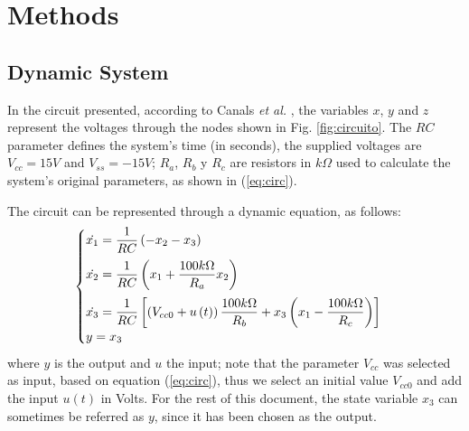 \section{Methods}\label{sec:meth}
\subsection{Dynamic System}
In the circuit presented, according to Canals \textit{et al.} \cite{canals2014random}, the variables $x$, $y$ and $z$ represent the voltages through the nodes shown in Fig. \ref{fig:circuito}. The $RC$ parameter defines the system's time (in seconds), the supplied voltages are $V_{cc}=15V$ and $V_{ss}=-15V$; $R_a$, $R_b$ y $R_c$ are resistors in $k\Omega$ used to calculate the system's original parameters, as shown in (\ref{eq:circ}).

The circuit can be represented through a dynamic equation, as follows:
\begin{equation}
\begin{cases}
	\dot{x_1}=\dfrac{1}{RC}\left(-x_2-x_3\right)&\vspace{2mm}\\\vspace{2mm}
	\dot{x_2}=\dfrac{1}{RC}\left(x_1+\dfrac{100k\Omega}{R_a}x_2\right)&\\
	\dot{x_3}=\dfrac{1}{RC}\left[\left(V_{cc0}+u\left(t\right)\right)\dfrac{100k\Omega}{R_b}+x_3\left(x_1-\dfrac{100k\Omega}{R_c}\right)\right]&\\
	y = x_3
\end{cases}
\label{eq:state}
\end{equation}
where $y$ is the output and $u$ the input; note that the parameter $V_{cc}$ was selected as input, based on equation (\ref{eq:circ}), thus we select an initial value $V_{cc0}$ and add the input $u\left(t\right)$ in Volts. For the rest of this document, the state variable $x_3$ can sometimes be referred as $y$, since it has been chosen as the output.

